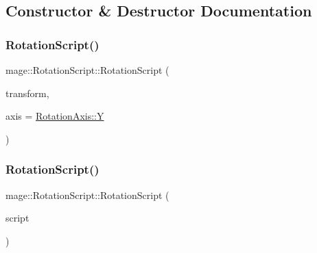 \subsection{Constructor \& Destructor Documentation}
\hypertarget{classmage_1_1_rotation_script_a731c7c3dbe7064fe876f80307952b595}{}\label{classmage_1_1_rotation_script_a731c7c3dbe7064fe876f80307952b595} 
\subsubsection{\texorpdfstring{Rotation\+Script()}{RotationScript()}\hspace{0.1cm}{\footnotesize\ttfamily [1/3]}}
{\footnotesize\ttfamily mage\+::\+Rotation\+Script\+::\+Rotation\+Script (\begin{DoxyParamCaption}\item[{Transform\+Node $\ast$}]{transform,  }\item[{\hyperlink{classmage_1_1_rotation_script_ad06cf896ce6dfe4f6676b263d15b4ee9}{Rotation\+Axis}}]{axis = {\ttfamily \hyperlink{classmage_1_1_rotation_script_ad06cf896ce6dfe4f6676b263d15b4ee9a57cec4137b614c87cb4e24a3d003a3e0}{Rotation\+Axis\+::Y}} }\end{DoxyParamCaption})}

\hypertarget{classmage_1_1_rotation_script_a52ee0473609565766fc1153678ee8b60}{}\label{classmage_1_1_rotation_script_a52ee0473609565766fc1153678ee8b60} 
\subsubsection{\texorpdfstring{Rotation\+Script()}{RotationScript()}\hspace{0.1cm}{\footnotesize\ttfamily [2/3]}}
{\footnotesize\ttfamily mage\+::\+Rotation\+Script\+::\+Rotation\+Script (\begin{DoxyParamCaption}\item[{const \hyperlink{classmage_1_1_rotation_script}{Rotation\+Script} \&}]{script }\end{DoxyParamCaption})\hspace{0.3cm}{\ttfamily [delete]}}

